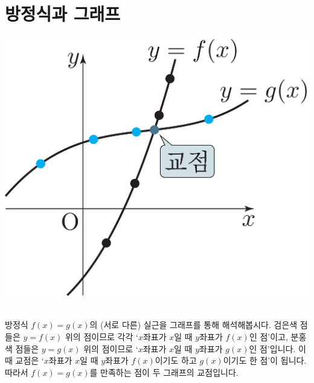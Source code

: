 \section{방정식과 그래프}
\begin{center} \includegraphics[scale=\pgfkeysvalueof{picsize}]{DBs/pic/zery_18.pdf}\
	\end{center}방정식 $f\left( x \right)= g\left( x \right) $의 (서로 다른) 실근을 그래프를 통해 해석해봅시다.
검은색 점들은 $y=f\left( x \right) $ 위의 점이므로 각각 `$x$좌표가 $x$일 때 $y$좌표가 $f\left( x \right) $인 점'이고, 분홍색 점들은 $y=g\left( x \right) $ 위의 점이므로 `$x$좌표가 $x$일 때 $y$좌표가 $g\left( x \right) $인 점'입니다. 이때 교점은 `$x$좌표가 $x$일 때 $y$좌표가 $f\left( x \right) $이기도 하고 $g\left( x \right) $이기도 한 점'이 됩니다. 따라서 $f\left( x \right) = g\left( x \right) $를 만족하는 점이 두 그래프의 교점입니다.
